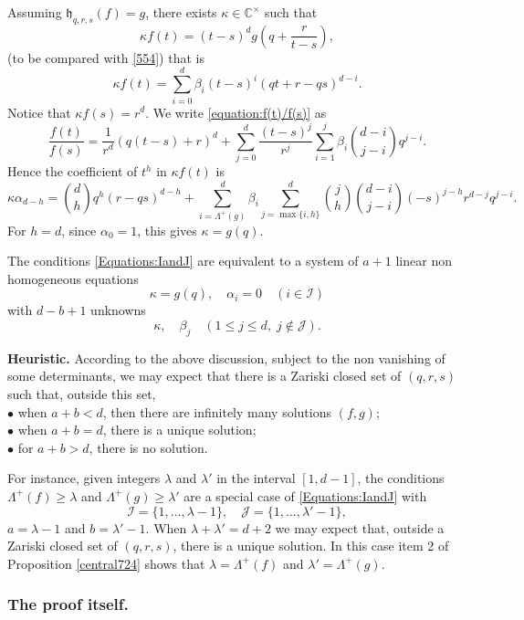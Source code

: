 \documentclass[10pt]{article}
\theoremstyle{definition}
\numberwithin{equation}{section}
\newcommand {\C}{{\mathbb{C}}}
\begin{document}
Assuming $\mathfrak h_{q,r,s} (f) = g$, there exists $\kappa\in\C^\times$ such that 
\[
\kappa f(t)=(t-s)^d g \left( q+\frac r {t-s}\right),
\]
(to be compared with \eqref{554})
that is 
\[
\kappa f(t)= \sum_{i=0}^d \beta_i(t-s)^i (qt+r-qs)^{d-i}.
\]
Notice that $\kappa f(s)= r^d$. We write \eqref{equation:f(t)/f(s)} as
\[
\frac {f(t)}{f(s)}= \frac 1 {r^d} (q(t-s) + r )^d+\sum_{j=0}^d \frac{(t-s)^j}{r^j}\sum_{i=1}^j \beta_i\binom{d-i}{j-i} 
 q^{j-i}.
 \]
Hence the coefficient of $t^h$ in $\kappa f(t)$ is 
\begin{equation*}
\kappa\alpha_{d-h}= \binom d h q^h (r-qs)^{d-h}+
\sum_{i=\Lambda^+(g)}^d \beta_i \sum_{j=\max\{i,h\}}^d \binom j h \binom {d-i}{j-i}(-s)^{j-h} r^{d-j}q^{j-i}.
\end{equation*}
For $h=d$, since $\alpha_0=1$, this gives $\kappa =g(q)$. 

 The conditions \eqref{Equations:IandJ} 
 are equivalent to a system of $a+1$ linear non homogeneous equations 
\[
\kappa=g(q), \quad \alpha_i=0 \quad (i\in \mathcal I)
\]
with $d-b+1$ unknowns 
\[
\kappa,\quad \beta_j \quad (1\leqslant j\leqslant d,\; j\not\in \mathcal J).
\] 
 

\noindent
{\bf Heuristic.} 
According to the above discussion, subject to the non vanishing of some determinants, we may expect that there is a Zariski closed set of $(q,r,s)$ such that, 
outside this set, 
\\
$\bullet$ when $a+b<d$, then there are infinitely many solutions $(f,g)$;
\\
$\bullet$ when $a+b=d$, there is a unique solution;
\\
$\bullet$ for $a+b>d$, there is no solution.

For instance, given integers $\lambda$ and $\lambda'$ in the interval $[1,d-1]$, the conditions $\Lambda^+(f)\geqslant \lambda$ and $\Lambda^+(g)\geqslant \lambda'$ are a special case of \eqref{Equations:IandJ} with 
\[
\mathcal I=\{1,\dots,\lambda-1\}, \quad \mathcal J=\{1,\dots,\lambda'-1\}, 
\]
$a=\lambda-1$ and $b=\lambda'-1$. 
When $\lambda +\lambda'=d+2$ we may expect that, outside a Zariski closed set of $(q,r,s)$, there is a unique solution. 
In this case item 2 of Proposition 
 \ref{central724} 
shows that $\lambda=\Lambda^+(f)$ and $\lambda'=\Lambda^+(g)$.

\subsubsection{The proof itself.} 
\end{document}
